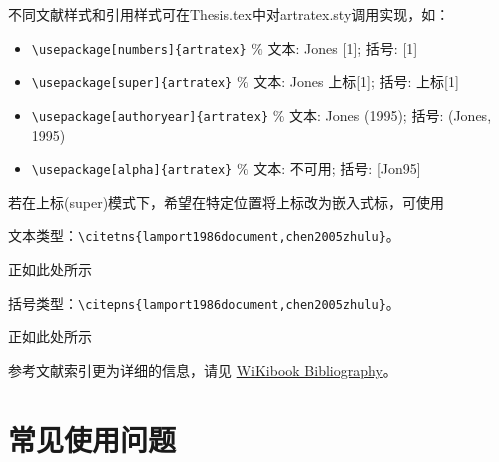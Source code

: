 不同文献样式和引用样式可在Thesis.tex中对artratex.sty调用实现，如：
\begin{itemize}
    \footnotesize
    \item \verb+\usepackage[numbers]{artratex}+ $\%$ 文本: Jones [1]; 括号: [1]
    \item \verb+\usepackage[super]{artratex}+ $\%$ 文本: Jones 上标[1]; 括号: 上标[1]
    \item \verb+\usepackage[authoryear]{artratex}+ $\%$ 文本: Jones (1995); 括号: (Jones, 1995)
    \item \verb+\usepackage[alpha]{artratex}+ $\%$ 文本: 不可用; 括号: [Jon95]
\end{itemize}

若在上标(super)模式下，希望在特定位置将上标改为嵌入式标，可使用

文本类型：\verb|\citetns{lamport1986document,chen2005zhulu}|。

正如此处所示

括号类型：\verb|\citepns{lamport1986document,chen2005zhulu}|。

正如此处所示

参考文献索引更为详细的信息，请见 \href{https://en.wikibooks.org/wiki/LaTeX/Bibliography_Management}{WiKibook Bibliography}。

\nocite{*}

\section{常见使用问题}\label{sec:qa}

